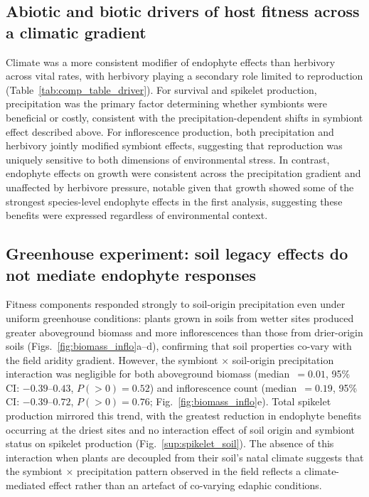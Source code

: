 \documentclass[12pt]{article}\usepackage[]{graphicx}\usepackage[dvipsnames]{xcolor}
\begin{document}
\subsection*{Abiotic and biotic drivers of host fitness across a climatic gradient}
Climate was a more consistent modifier of endophyte effects than herbivory across vital rates, with herbivory playing a secondary role limited to reproduction (Table~\ref{tab:comp_table_driver}). 
For survival and spikelet production, precipitation was the primary factor determining whether symbionts were beneficial or costly, consistent with the precipitation-dependent shifts in symbiont effect described above. 
For inflorescence production, both precipitation and herbivory jointly modified symbiont effects, suggesting that reproduction was uniquely sensitive to both dimensions of environmental stress.
 In contrast, endophyte effects on growth were consistent across the precipitation gradient and unaffected by herbivore pressure, notable given that growth showed some of the strongest species-level endophyte effects in the first analysis, suggesting these benefits were expressed regardless of environmental context. 
 
 \subsection*{Greenhouse experiment: soil legacy effects do not mediate endophyte responses}
Fitness components responded strongly to soil-origin precipitation even under uniform greenhouse conditions: plants grown in soils from wetter sites produced greater aboveground biomass and more inflorescences than those from drier-origin soils (Figs.~\ref{fig:biomass_inflo}a--d), confirming that soil properties co-vary with the field aridity gradient. 
However, the symbiont $\times$ soil-origin precipitation interaction was negligible for both aboveground biomass (median~$= 0.01$, 95\% CI: $-0.39$--$0.43$, $P(>0) = 0.52$) and inflorescence count (median~$= 0.19$, 95\% CI: $-0.39$--$0.72$, $P(>0) = 0.76$; Fig.~\ref{fig:biomass_inflo}e). 
Total spikelet production mirrored this trend, with the greatest reduction in endophyte benefits occurring at the driest sites and no interaction effect of soil origin and symbiont status on spikelet production (Fig.~\ref{sup:spikelet_soil}).
The absence of this interaction when plants are decoupled from their soil's natal climate suggests that the symbiont $\times$ precipitation pattern observed in the field reflects a climate-mediated effect rather than an artefact of co-varying edaphic conditions.
\end{document}
